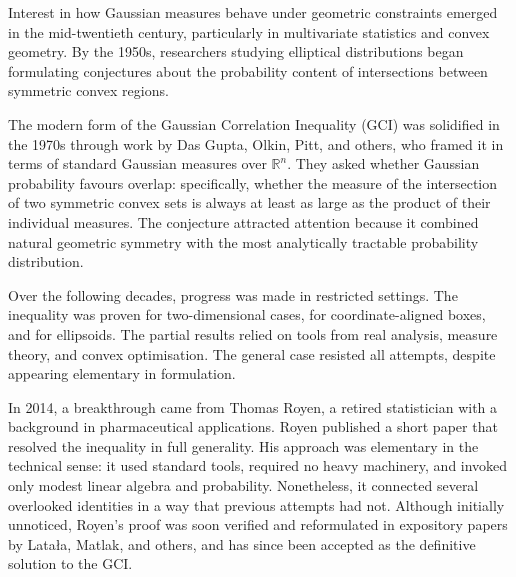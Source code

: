 \begin{historical}
Interest in how Gaussian measures behave under geometric constraints emerged in the mid-twentieth century, particularly in multivariate statistics and convex geometry. By the 1950s, researchers studying elliptical distributions began formulating conjectures about the probability content of intersections between symmetric convex regions.

The modern form of the Gaussian Correlation Inequality (GCI) was solidified in the 1970s through work by Das Gupta, Olkin, Pitt, and others, who framed it in terms of standard Gaussian measures over \(\mathbb{R}^n\). They asked whether Gaussian probability favours overlap: specifically, whether the measure of the intersection of two symmetric convex sets is always at least as large as the product of their individual measures. The conjecture attracted attention because it combined natural geometric symmetry with the most analytically tractable probability distribution.

Over the following decades, progress was made in restricted settings. The inequality was proven for two-dimensional cases, for coordinate-aligned boxes, and for ellipsoids. The partial results relied on tools from real analysis, measure theory, and convex optimisation. The general case resisted all attempts, despite appearing elementary in formulation.

In 2014, a breakthrough came from Thomas Royen, a retired statistician with a background in pharmaceutical applications. Royen published a short paper that resolved the inequality in full generality. His approach was elementary in the technical sense: it used standard tools, required no heavy machinery, and invoked only modest linear algebra and probability. Nonetheless, it connected several overlooked identities in a way that previous attempts had not. Although initially unnoticed, Royen's proof was soon verified and reformulated in expository papers by Latała, Matlak, and others, and has since been accepted as the definitive solution to the GCI.
\end{historical}
